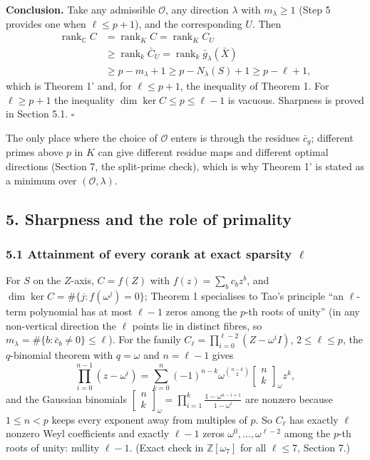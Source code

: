 \documentclass[
  11pt,
  a4paper,
]{article}
\begin{document}
\textbf{Conclusion.} Take any admissible \(\mathcal O\), any direction
\(\lambda\) with \(m_\lambda\ge1\) (Step 5 provides one when
\(\ell\le p+1\)), and the corresponding \(U\). Then \[\begin{aligned}
\operatorname{rank}_{\mathbb C}C
&=\operatorname{rank}_KC=\operatorname{rank}_KC_U\\
&\ge\operatorname{rank}_k\bar C_U=\operatorname{rank}_k\bar g_\lambda(\bar X)\\
&\ge p-m_\lambda+1\ge p-N_\lambda(S)+1\ge p-\ell+1,
\end{aligned}\] which is Theorem 1' and, for \(\ell\le p+1\), the
inequality of Theorem 1. For \(\ell\ge p+1\) the inequality
\(\dim\ker C\le p\le\ell-1\) is vacuous. Sharpness is proved in Section
5.1. \(\square\)

The only place where the choice of \(\mathcal O\) enters is through the
residues \(\bar c_g\); different primes above \(p\) in \(K\) can give
different residue maps and different optimal directions (Section 7, the
split-prime check), which is why Theorem 1' is stated as a minimum over
\((\mathcal O,\allowbreak{}\lambda)\).

\subsection{5. Sharpness and the role of
primality}\label{sharpness-and-the-role-of-primality}

\subsubsection{\texorpdfstring{5.1 Attainment of every corank at exact
sparsity
\(\ell\)}{5.1 Attainment of every corank at exact sparsity \textbackslash ell}}\label{attainment-of-every-corank-at-exact-sparsity-ell}

For \(S\) on the \(Z\)-axis, \(C=f(Z)\) with \(f(z)=\sum_bc_bz^b\), and
\(\dim\ker C=\#\{j:f(\omega^j)=0\}\); Theorem 1 specialises to Tao's
principle ``an \(\ell\)-term polynomial has at most \(\ell-1\) zeros
among the \(p\)-th roots of unity'' (in any non-vertical direction the
\(\ell\) points lie in distinct fibres, so
\(m_\lambda=\#\{b:\bar c_b\ne0\}\le\ell\)). For the family
\(C_\ell=\prod_{i=0}^{\ell-2}(Z-\omega^iI)\), \(2\le\ell\le p\), the
\(q\)-binomial theorem with \(q=\omega\) and \(n=\ell-1\) gives
\[\prod_{i=0}^{n-1}(z-\omega^i)=\sum_{k=0}^{n}(-1)^{n-k}\omega^{\binom{n-k}{2}}\begin{bmatrix}n\\k\end{bmatrix}_\omega z^k,\]
and the Gaussian binomials
\(\begin{bmatrix}n\\k\end{bmatrix}_\omega=\prod_{i=1}^k\frac{1-\omega^{n-i+1}}{1-\omega^i}\)
are nonzero because \(1\le n<p\) keeps every exponent away from
multiples of \(p\). So \(C_\ell\) has exactly \(\ell\) nonzero Weyl
coefficients and exactly \(\ell-1\) zeros
\(\omega^0,\allowbreak{}\dots,\allowbreak{}\omega^{\ell-2}\) among the \(p\)-th roots of unity:
nullity \(\ell-1\). (Exact check in \(\mathbb Z[\omega_7]\) for all
\(\ell\le7\), Section 7.)
\end{document}
